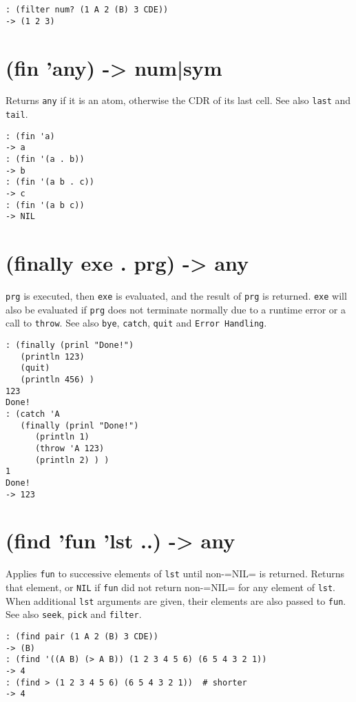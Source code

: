 {{{{{{\begin{verbatim}
: (filter num? (1 A 2 (B) 3 CDE))
-> (1 2 3)
\end{verbatim}

 
\section{(fin 'any) -> num|sym}
\label{sec-8-1-6-10}


Returns \texttt{any} if it is an atom, otherwise the CDR of its last cell. See
also \texttt{last} and \texttt{tail}.


\begin{verbatim}
: (fin 'a)
-> a
: (fin '(a . b))
-> b
: (fin '(a b . c))
-> c
: (fin '(a b c))
-> NIL
\end{verbatim}

 
\section{(finally exe . prg) -> any}
\label{sec-8-1-6-11}


\texttt{prg} is executed, then \texttt{exe} is evaluated, and the result of \texttt{prg} is
returned. \texttt{exe} will also be evaluated if \texttt{prg} does not terminate
normally due to a runtime error or a call to \texttt{throw}. See also \texttt{bye},
\texttt{catch}, \texttt{quit} and \texttt{Error Handling}.


\begin{verbatim}
: (finally (prinl "Done!")
   (println 123)
   (quit)
   (println 456) )
123
Done!
: (catch 'A
   (finally (prinl "Done!")
      (println 1)
      (throw 'A 123)
      (println 2) ) )
1
Done!
-> 123
\end{verbatim}

 
\section{(find 'fun 'lst ..) -> any}
\label{sec-8-1-6-12}


Applies \texttt{fun} to successive elements of \texttt{lst} until non-=NIL= is
returned. Returns that element, or \texttt{NIL} if \texttt{fun} did not return
non-=NIL= for any element of \texttt{lst}. When additional \texttt{lst} arguments are
given, their elements are also passed to \texttt{fun}. See also \texttt{seek}, \texttt{pick}
and \texttt{filter}.


\begin{verbatim}
: (find pair (1 A 2 (B) 3 CDE))
-> (B)
: (find '((A B) (> A B)) (1 2 3 4 5 6) (6 5 4 3 2 1))
-> 4
: (find > (1 2 3 4 5 6) (6 5 4 3 2 1))  # shorter
-> 4
\end{verbatim}

}}}}}}
